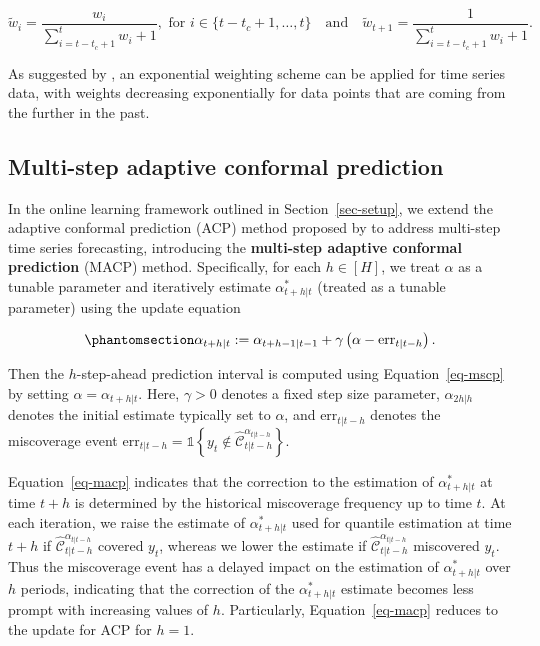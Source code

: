\documentclass[
  11pt,
  a4paper,
]{article}
\theoremstyle{plain}
\theoremstyle{remark}
\begin{document}
\[
\tilde{w}_i = \frac{w_i}{\sum_{i=t-t_c+1}^{t}w_i+1}, \text{ for } i \in \{t-t_c+1,\ldots,t\} \quad \text{and} \quad \tilde{w}_{t+1} =  \frac{1}{\sum_{i=t-t_c+1}^{t}w_i+1}.
\]

As suggested by \textcite{barber2023}, an exponential weighting scheme
can be applied for time series data, with weights decreasing
exponentially for data points that are coming from the further in the
past.

\subsection{Multi-step adaptive conformal
prediction}\label{multi-step-adaptive-conformal-prediction}

In the online learning framework outlined in Section~\ref{sec-setup}, we
extend the adaptive conformal prediction (ACP) method proposed by
\textcite{gibbs2021} to address multi-step time series forecasting,
introducing the \textbf{multi-step adaptive conformal prediction} (MACP)
method. Specifically, for each \(h \in [H]\), we treat \(\alpha\) as a
tunable parameter and iteratively estimate \(\alpha_{t+h|t}^{*}\)
(treated as a tunable parameter) using the update equation

\begin{equation}\phantomsection\label{eq-macp}{
\alpha_{t+h|t} := \alpha_{t+h-1|t-1} + \gamma\left(\alpha - \mathrm{err}_{t|t-h}\right).
}\end{equation}

Then the \(h\)-step-ahead prediction interval is computed using
Equation~\ref{eq-mscp} by setting \(\alpha = \alpha_{t+h|t}\). Here,
\(\gamma > 0\) denotes a fixed step size parameter, \(\alpha_{2h|h}\)
denotes the initial estimate typically set to \(\alpha\), and
\(\mathrm{err}_{t|t-h}\) denotes the miscoverage event
\(\mathrm{err}_{t|t-h} = \mathbb{1}\left\{y_t \notin \hat{\mathcal{C}}_{t|t-h}^{\alpha_{t|t-h}}\right\}\).

Equation~\ref{eq-macp} indicates that the correction to the estimation
of \(\alpha_{t+h|t}^{*}\) at time \(t+h\) is determined by the
historical miscoverage frequency up to time \(t\). At each iteration, we
raise the estimate of \(\alpha_{t+h|t}^{*}\) used for quantile
estimation at time \(t+h\) if
\(\hat{\mathcal{C}}_{t|t-h}^{\alpha_{t|t-h}}\) covered \(y_t\), whereas
we lower the estimate if \(\hat{\mathcal{C}}_{t|t-h}^{\alpha_{t|t-h}}\)
miscovered \(y_t\). Thus the miscoverage event has a delayed impact on
the estimation of \(\alpha_{t+h|t}^{*}\) over \(h\) periods, indicating
that the correction of the \(\alpha_{t+h|t}^{*}\) estimate becomes less
prompt with increasing values of \(h\). Particularly,
Equation~\ref{eq-macp} reduces to the update for ACP for \(h=1\).
\end{document}
